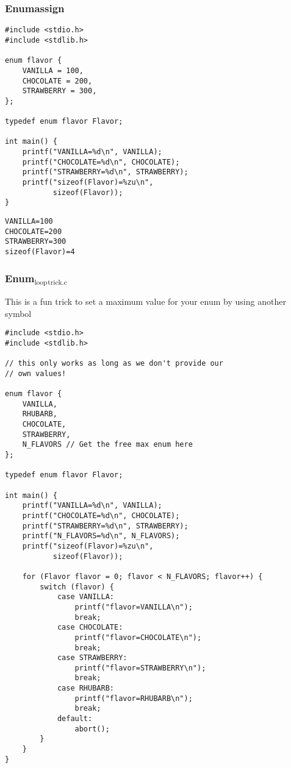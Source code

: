 \documentclass[11pt]{article}
\begin{document}
\subsubsection{Enumassign}
\label{sec:org43ffccb}

\begin{verbatim}
#include <stdio.h>
#include <stdlib.h>

enum flavor {
    VANILLA = 100,
    CHOCOLATE = 200,
    STRAWBERRY = 300,
};

typedef enum flavor Flavor;

int main() {
    printf("VANILLA=%d\n", VANILLA);
    printf("CHOCOLATE=%d\n", CHOCOLATE);
    printf("STRAWBERRY=%d\n", STRAWBERRY);
    printf("sizeof(Flavor)=%zu\n",
           sizeof(Flavor));
}
\end{verbatim}

\begin{verbatim}
VANILLA=100
CHOCOLATE=200
STRAWBERRY=300
sizeof(Flavor)=4
\end{verbatim}

\subsubsection{Enum\(_{\text{loop}}\)\(_{\text{trick.c}}\)}
\label{sec:org2bc22c6}

This is a fun trick to set a maximum value for your enum by using
another symbol


\begin{verbatim}
#include <stdio.h>
#include <stdlib.h>

// this only works as long as we don't provide our
// own values!

enum flavor {
    VANILLA,
    RHUBARB,
    CHOCOLATE,
    STRAWBERRY,
    N_FLAVORS // Get the free max enum here
};

typedef enum flavor Flavor;

int main() {
    printf("VANILLA=%d\n", VANILLA);
    printf("CHOCOLATE=%d\n", CHOCOLATE);
    printf("STRAWBERRY=%d\n", STRAWBERRY);
    printf("N_FLAVORS=%d\n", N_FLAVORS);
    printf("sizeof(Flavor)=%zu\n",
           sizeof(Flavor));

    for (Flavor flavor = 0; flavor < N_FLAVORS; flavor++) {
        switch (flavor) {
            case VANILLA:
                printf("flavor=VANILLA\n");
                break;
            case CHOCOLATE:
                printf("flavor=CHOCOLATE\n");
                break;
            case STRAWBERRY:
                printf("flavor=STRAWBERRY\n");
                break;
            case RHUBARB:
                printf("flavor=RHUBARB\n");
                break;
            default:
                abort();
        }
    }
}
\end{verbatim}
\end{document}
